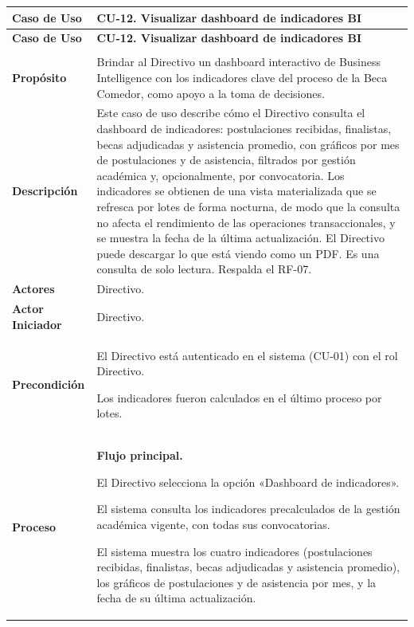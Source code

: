 \begin{longtable}{>{\raggedright\arraybackslash}p{2.9cm} >{\raggedright\arraybackslash}p{12.6cm}}
\toprule
\textbf{Caso de Uso} & \textbf{CU-12. Visualizar dashboard de indicadores BI} \\
\midrule
\endfirsthead
\toprule
\textbf{Caso de Uso} & \textbf{CU-12. Visualizar dashboard de indicadores BI} \\
\midrule
\endhead
\endfoot
\bottomrule
\multicolumn{2}{l}{\textit{Nota.} Elaboración propia.} \\
\endlastfoot
\textbf{Propósito} & Brindar al Directivo un dashboard interactivo de Business Intelligence con los indicadores clave del proceso de la Beca Comedor, como apoyo a la toma de decisiones. \\
\midrule
\textbf{Descripción} & Este caso de uso describe cómo el Directivo consulta el dashboard de indicadores: postulaciones recibidas, finalistas, becas adjudicadas y asistencia promedio, con gráficos por mes de postulaciones y de asistencia, filtrados por gestión académica y, opcionalmente, por convocatoria. Los indicadores se obtienen de una vista materializada que se refresca por lotes de forma nocturna, de modo que la consulta no afecta el rendimiento de las operaciones transaccionales, y se muestra la fecha de la última actualización. El Directivo puede descargar lo que está viendo como un PDF. Es una consulta de solo lectura. Respalda el RF-07. \\
\midrule
\textbf{Actores} & Directivo. \\
\midrule
\textbf{Actor Iniciador} & Directivo. \\
\midrule
\textbf{Precondición} & \vspace{-\baselineskip}\begin{cuvin}
    \item El Directivo está autenticado en el sistema (CU-01) con el rol Directivo.
    \item Los indicadores fueron calculados en el último proceso por lotes.
\end{cuvin} \\
\midrule
\textbf{Proceso} & \textbf{Flujo principal.}
\begin{cupasos}
    \item El Directivo selecciona la opción «Dashboard de indicadores».
    \item El sistema consulta los indicadores precalculados de la gestión académica vigente, con todas sus convocatorias.
    \item El sistema muestra los cuatro indicadores (postulaciones recibidas, finalistas, becas adjudicadas y asistencia promedio), los gráficos de postulaciones y de asistencia por mes, y la fecha de su última actualización.

\end{cupasos}
\end{longtable}
